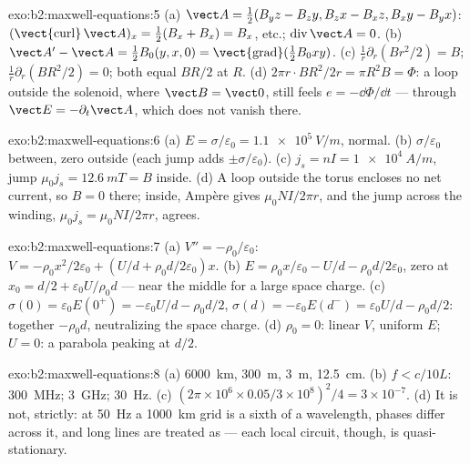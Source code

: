 \begin{solution}{exo:b2:maxwell-equations:5}
(a) $\vect A = \tfrac12(B_yz - B_zy, B_zx - B_xz, B_xy - B_yx)$: $(\operatorname{\vect{curl}}
\vect A)_x = \tfrac12(B_x + B_x) = B_x$, etc.; $\operatorname{div}\vect A = 0$. (b)
$\vect A' - \vect A = \tfrac12B_0(y, x, 0) = \operatorname{\vect{grad}}(\tfrac12B_0xy)$. (c)
$\frac1r\partial_r(Br^2/2) = B$; $\frac1r\partial_r(BR^2/2) = 0$; both equal $BR/2$ at
$R$. (d) $2\pi r\cdot BR^2/2r = \pi R^2B = \Phi$: a loop outside the solenoid,
where $\vect B = \vect 0$, still feels $e = -\dd\Phi/\dd t$ --- through $\vect E =
-\partial_t\vect A$, which does not vanish there.
\end{solution}

\begin{solution}{exo:b2:maxwell-equations:6}
(a) $E = \sigma/\varepsilon_0 = \qty{1.1e5}{V/m}$, normal. (b) $\sigma/\varepsilon_0$ between, zero
outside (each jump adds $\pm\sigma/\varepsilon_0$). (c) $j_s = nI = \qty{1e4}{A/m}$, jump
$\mu_0j_s = \qty{12.6}{mT} = B$ inside. (d) A loop outside the torus encloses
no net current, so $B = 0$ there; inside, Ampère gives $\mu_0NI/2\pi r$,
and the jump across the winding, $\mu_0j_s = \mu_0NI/2\pi r$, agrees.
\end{solution}

\begin{solution}{exo:b2:maxwell-equations:7}
(a) $V'' = -\rho_0/\varepsilon_0$: $V = -\rho_0x^2/2\varepsilon_0 + (U/d + \rho_0d/2\varepsilon_0)x$. (b)
$E = \rho_0x/\varepsilon_0 - U/d - \rho_0d/2\varepsilon_0$, zero at $x_0 = d/2 + \varepsilon_0U/\rho_0d$
--- near the middle for a large space charge. (c) $\sigma(0) = \varepsilon_0E(0^+) =
-\varepsilon_0U/d - \rho_0d/2$, $\sigma(d) = -\varepsilon_0E(d^-) = \varepsilon_0U/d - \rho_0d/2$: together
$-\rho_0d$, neutralizing the space charge. (d) $\rho_0 = 0$: linear $V$, uniform
$E$; $U = 0$: a parabola peaking at $d/2$.
\end{solution}

\begin{solution}{exo:b2:maxwell-equations:8}
(a) \qty{6000}{km}, \qty{300}{m}, \qty{3}{m}, \qty{12.5}{cm}. (b) $f < c/10L$:
\qty{300}{MHz}; \qty{3}{GHz}; \qty{30}{Hz}. (c) $(2\pi \times 10^6 \times 0.05/3 \times 10^8)^2/4 =
3 \times 10^{-7}$. (d) It is not, strictly: at \qty{50}{Hz} a \qty{1000}{km} grid is a
sixth of a wavelength, phases differ across it, and long lines are
treated as  --- each local circuit, though, is
quasi-stationary.
\end{solution}

